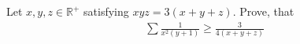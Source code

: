Let $x,y,z \in \mathbb{R}^+$ satisfying $xyz=3(x+y+z)$. Prove, that
\begin{align*} \sum \frac{1}{x^2(y+1)} \geq \frac{3}{4(x+y+z)} \end{align*}